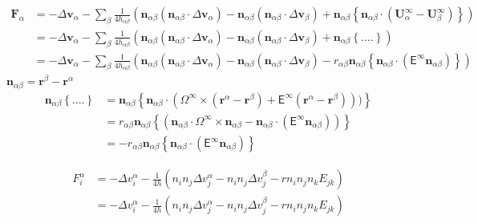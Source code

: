 \documentclass[12pt]{article}
\newcommand{\tens}[1]{\bm{\mathsf{#1}}}
\begin{document}
\begin{align*}
  \bm{F}_\alpha  &= 
  -  \Delta \bm{v}_\alpha
  - \sum_{\beta}
  \frac{1}{4h_{\alpha\beta}}
  \left(
    \bm{n}_{\alpha\beta} (\bm{n}_{\alpha\beta}\cdot \Delta \bm{v}_{\alpha})
    - 
    \bm{n}_{\alpha\beta} (\bm{n}_{\alpha\beta}\cdot \Delta \bm{v}_\beta )
    +
    \bm{n}_{\alpha\beta}
    \left\{
      \bm{n}_{\alpha\beta}  \cdot
      (\bm{U}_{\alpha}^{\infty}-\bm{U}_{\beta}^{\infty})
    \right\}
  \right)  \\
&=  -  \Delta \bm{v}_\alpha 
 - \sum_{\beta}
  \frac{1}{4h_{\alpha\beta}}
  \left(
    \bm{n}_{\alpha\beta} (\bm{n}_{\alpha\beta}\cdot \Delta \bm{v}_{\alpha})
    - 
    \bm{n}_{\alpha\beta} (\bm{n}_{\alpha\beta}\cdot \Delta \bm{v}_\beta )
    +
    \bm{n}_{\alpha\beta}
    \left\{
  ....
    \right\}
  \right) \\
&=  -  \Delta \bm{v}_\alpha 
 - \sum_{\beta}
  \frac{1}{4h_{\alpha\beta}}
  \left(
    \bm{n}_{\alpha\beta} (\bm{n}_{\alpha\beta}\cdot \Delta \bm{v}_{\alpha})
    - 
    \bm{n}_{\alpha\beta} (\bm{n}_{\alpha\beta}\cdot \Delta \bm{v}_\beta )
    -
r_{\alpha\beta}
  \bm{n}_{\alpha\beta}
  \left\{
\bm{n}_{\alpha\beta} \cdot
(\tens{E}^{\infty} \bm{n}_{\alpha\beta})
    \right\} 
  \right) 
\end{align*}
$\bm{n}_{\alpha\beta} = \bm{r}^{\beta}-\bm{r}^{\alpha}$
\begin{align*}
    \bm{n}_{\alpha\beta}    \left\{
  ....
    \right\} &= 
  \bm{n}_{\alpha\beta}
  \left\{
    \bm{n}_{\alpha\beta}  \cdot
      (
\Omega^{\infty} \times (\bm{r}^{\alpha}-\bm{r}^{\beta})
+ 
\tens{E}^{\infty}
(\bm{r}^{\alpha}-\bm{r}^{\beta}))
)
    \right\} \\
&= 
r_{\alpha\beta}
  \bm{n}_{\alpha\beta}
  \left\{
      (
\bm{n}_{\alpha\beta} \cdot \Omega^{\infty} \times \bm{n}_{\alpha\beta}
- 
\bm{n}_{\alpha\beta} \cdot
(\tens{E}^{\infty} \bm{n}_{\alpha\beta})
)
    \right\} \\
&= 
-r_{\alpha\beta}
  \bm{n}_{\alpha\beta}
  \left\{
\bm{n}_{\alpha\beta} \cdot
(\tens{E}^{\infty} \bm{n}_{\alpha\beta})
    \right\} 
\end{align*}

\begin{align*}
 F^{\alpha}_i
&=
- \Delta v^{\alpha}_i
- \frac{1}{4 h}
\left(
n_{i} n_j \Delta v^{\alpha}_j
- n_{i} n_j \Delta v^{\beta}_j
- r n_i n_j n_k E_{jk}
\right) \\
&=
- \Delta v^{\alpha}_i
- \frac{1}{4 h}
\left(
n_{i} n_j \Delta v^{\alpha}_j
- n_{i} n_j \Delta v^{\beta}_j
- r n_i n_j n_k E_{jk}
\right) 
\end{align*}
\end{document}

